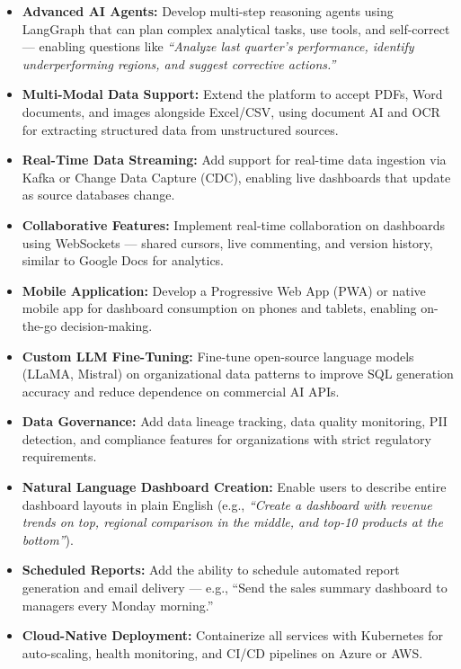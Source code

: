\documentclass[12pt,a4paper]{report}
\begin{document}
\begin{itemize}[leftmargin=1.5cm]
    \item \textbf{Advanced AI Agents:} Develop multi-step reasoning agents using LangGraph that can plan complex analytical tasks, use tools, and self-correct --- enabling questions like \textit{``Analyze last quarter's performance, identify underperforming regions, and suggest corrective actions.''}

    \item \textbf{Multi-Modal Data Support:} Extend the platform to accept PDFs, Word documents, and images alongside Excel/CSV, using document AI and OCR for extracting structured data from unstructured sources.

    \item \textbf{Real-Time Data Streaming:} Add support for real-time data ingestion via Kafka or Change Data Capture (CDC), enabling live dashboards that update as source databases change.

    \item \textbf{Collaborative Features:} Implement real-time collaboration on dashboards using WebSockets --- shared cursors, live commenting, and version history, similar to Google Docs for analytics.

    \item \textbf{Mobile Application:} Develop a Progressive Web App (PWA) or native mobile app for dashboard consumption on phones and tablets, enabling on-the-go decision-making.

    \item \textbf{Custom LLM Fine-Tuning:} Fine-tune open-source language models (LLaMA, Mistral) on organizational data patterns to improve SQL generation accuracy and reduce dependence on commercial AI APIs.

    \item \textbf{Data Governance:} Add data lineage tracking, data quality monitoring, PII detection, and compliance features for organizations with strict regulatory requirements.

    \item \textbf{Natural Language Dashboard Creation:} Enable users to describe entire dashboard layouts in plain English (e.g., \textit{``Create a dashboard with revenue trends on top, regional comparison in the middle, and top-10 products at the bottom''}).

    \item \textbf{Scheduled Reports:} Add the ability to schedule automated report generation and email delivery --- e.g., ``Send the sales summary dashboard to managers every Monday morning.''

    \item \textbf{Cloud-Native Deployment:} Containerize all services with Kubernetes for auto-scaling, health monitoring, and CI/CD pipelines on Azure or AWS.
\end{itemize}
\end{document}
